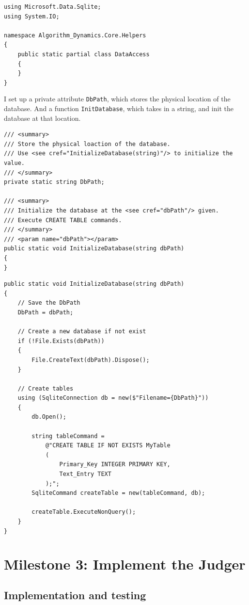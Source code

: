 \documentclass[a4paper]{report}
\newcommand{\code}{\texttt}
\begin{document}
\begin{verbatim}
using Microsoft.Data.Sqlite;
using System.IO;

namespace Algorithm_Dynamics.Core.Helpers
{
    public static partial class DataAccess
    {
    }
}
\end{verbatim}

I set up a private attribute \code{DbPath}, which stores the physical location of the database. And a function \code{InitDatabase}, which takes in a string, and init the database at that location.

\begin{verbatim}
/// <summary>
/// Store the physical loaction of the database.
/// Use <see cref="InitializeDatabase(string)"/> to initialize the value.
/// </summary>
private static string DbPath;

/// <summary>
/// Initialize the database at the <see cref="dbPath"/> given.
/// Execute CREATE TABLE commands.
/// </summary>
/// <param name="dbPath"></param>
public static void InitializeDatabase(string dbPath)
{
}
\end{verbatim}



\begin{verbatim}
public static void InitializeDatabase(string dbPath)
{
    // Save the DbPath
    DbPath = dbPath;

    // Create a new database if not exist
    if (!File.Exists(dbPath))
    {
        File.CreateText(dbPath).Dispose();
    }

    // Create tables
    using (SqliteConnection db = new($"Filename={DbPath}"))
    {
        db.Open();

        string tableCommand =
            @"CREATE TABLE IF NOT EXISTS MyTable 
            (
                Primary_Key INTEGER PRIMARY KEY,
                Text_Entry TEXT
            );";
        SqliteCommand createTable = new(tableCommand, db);

        createTable.ExecuteNonQuery();
    }
}
\end{verbatim}

\section{Milestone 3: Implement the Judger}

\subsection{Implementation and testing}
\end{document}
